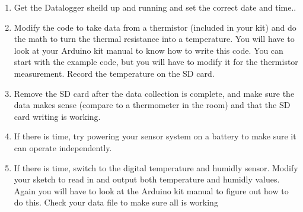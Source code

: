 	\begin{enumerate}
		\item Get the Datalogger sheild up and running and set the correct date and time..
		
		\item Modify the code to take data from a thermistor (included in your kit) and do the math to turn the thermal resistance into a temperature. You will have to look at your Arduino kit manual to know how to write this code. You can start with the example code, but you will have to modify it for the thermistor measurement. Record the temperature on the SD card.
		
		\item Remove the SD card after the data collection is complete, and make sure the data makes sense (compare to a thermometer in the room) and that the SD card writing is working.
		
		\item If there is time, try powering your sensor system on a battery to make sure it can operate independently.
		
		\item If there is time, switch to the digital temperature and humidly sensor. Modify your sketch to read in and output both temperature and humidly values. Again you will have to look at the Arduino kit manual to figure out how to do this. Check your data file to make sure all is working
	\end{enumerate}


